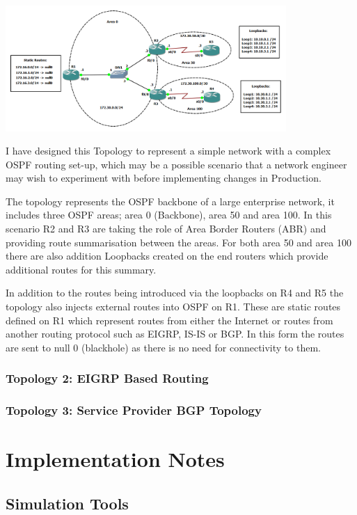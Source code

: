 \documentclass[11pt]{report}
\begin{document}
\begin{center}
\includegraphics[width=0.8\textwidth]{OSPF-Topology.png}
\end{center}

I have designed this Topology to represent a simple network with a complex OSPF routing set-up, which may be a possible scenario that a network engineer may wish to experiment with before implementing changes in Production.

The topology represents the OSPF backbone of a large enterprise network, it includes three OSPF areas; area 0 (Backbone), area 50 and area 100. In this scenario R2 and R3 are taking the role of Area Border Routers (ABR) and providing route summarisation between the areas. For both area 50 and area 100 there are also addition Loopbacks created on the end routers which provide additional routes for this summary.

In addition to the routes being introduced via the loopbacks on R4 and R5 the topology also injects external routes into OSPF on R1. These are static routes defined on R1 which represent routes from either the Internet or routes from another routing protocol such as EIGRP, IS-IS or BGP. In this form the routes are sent to null 0 (blackhole) as there is no need for connectivity to them.

\subsection{Topology 2: EIGRP Based Routing}

\subsection{Topology 3: Service Provider BGP Topology}

\chapter*{Implementation Notes}

\section*{Simulation Tools}
\end{document}
